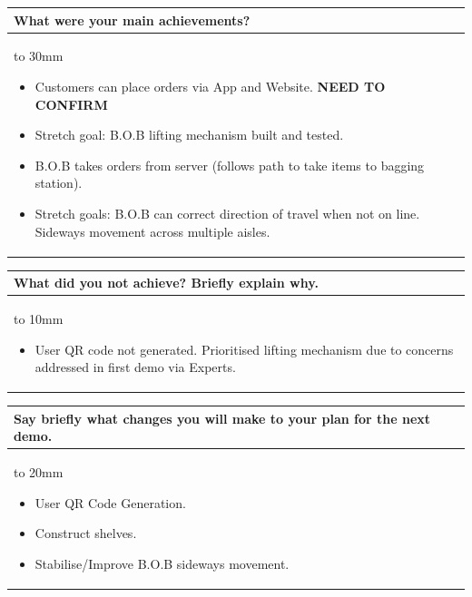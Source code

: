 \documentclass[a4paper]{article}
\newcommand{\colWidth}{141mm}
\begin{document}
\begin{center}

\begin{tabular}{|p{\colWidth}|}
	\hline
	\cellcolor{blue!25}\large
	\textbf{What were your main achievements?}
	\\ \hline
	\vtop to 30mm{
	\begin{itemize}
	    \item Customers can place orders via App and Website. \textbf{NEED TO CONFIRM}
	    \item Stretch goal: B.O.B lifting mechanism built and tested.
	    \item B.O.B takes orders from server (follows path to take items to bagging station).
	    \item Stretch goals: B.O.B can correct direction of travel when not on line. Sideways movement across multiple aisles.
	\end{itemize}
  }
  \\
  \hline
\end{tabular}
\vskip 5mm


\begin{tabular}{|p{\colWidth}|}
	\hline
	\cellcolor{blue!25}\large
	\textbf{What did you not achieve? Briefly explain why.}
	\\ \hline
	\vtop to 10mm{
	\begin{itemize}
	    \item User QR code not generated. Prioritised lifting mechanism due to concerns addressed in first demo via Experts.
	\end{itemize}
  }
  \\
  \hline
\end{tabular}
\vskip 5mm


\begin{tabular}{|p{\colWidth}|}
	\hline
	\cellcolor{blue!25}\large
	\textbf{Say briefly what changes you will make to your plan for the next demo.}
	\\ \hline
	\vtop to 20mm{
	\begin{itemize}
	    \item User QR Code Generation.
	    \item Construct shelves.
	    \item Stabilise/Improve B.O.B sideways movement.
	\end{itemize}
  }
  \\
  \hline
\end{tabular}


\end{center}
\end{document}
